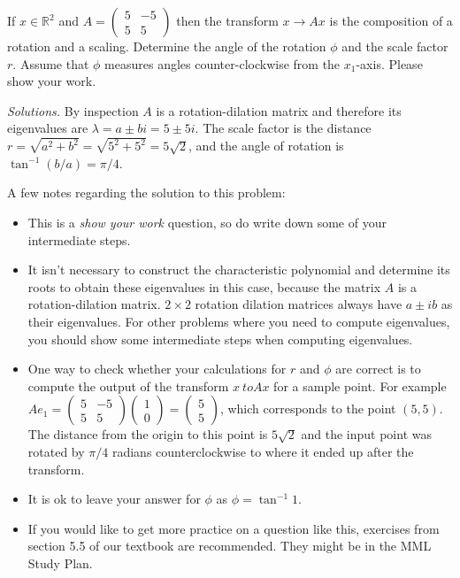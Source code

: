 \ifnum {} \newpage \fi


\ifnum {}
    \question[2] If $x \in \mathbb R^2$ and $A = \begin{pmatrix} 5&-5\\5&5\end{pmatrix}$ then the transform $x \to Ax$ is the composition of a rotation and a scaling. Determine the angle of the rotation $\phi$ and the scale factor $r$. Assume that $\phi$ measures angles counter-clockwise from the $x_1$-axis. Please show your work. 
    
    \ifnum {} {\color{DarkBlue} \textit{Solutions.} 
    By inspection $A$ is a rotation-dilation matrix and therefore its eigenvalues are $\lambda = a \pm bi = 5 \pm 5i$.
    The scale factor is the distance $r = \sqrt{a^2 + b^2} = \sqrt{5^2 + 5^2} = 5\sqrt 2$, and the angle of rotation is $\tan^{-1} (b/a) = \pi/4$. 
    
    A few notes regarding the solution to this problem: 
    \begin{itemize}
        \item This is a \textit{show your work} question, so do write down some of your intermediate steps. 
        \item It isn't necessary to construct the characteristic polynomial and determine its roots to obtain these eigenvalues in this case, because the matrix $A$ is a rotation-dilation matrix. $2\times 2$ rotation dilation matrices always have $a\pm ib$ as their eigenvalues. For other problems where you need to compute eigenvalues, you should show some intermediate steps when computing eigenvalues. 
        \item One way to check whether your calculations for $r$ and $\phi$ are correct is to compute the output of the transform $x \ to Ax$ for a sample point. For example $Ae_1 = \begin{pmatrix} 5&-5\\5&5\end{pmatrix}\begin{pmatrix} 1\\0 \end{pmatrix} = \begin{pmatrix}5\\5 \end{pmatrix}$, which corresponds to the point $(5,5)$. The distance from the origin to this point is $5\sqrt2$ and the input point was rotated by $\pi/4$ radians counterclockwise to where it ended up after the transform. 
        \item It is ok to leave your answer for $\phi$ as $\phi = \tan^{-1} 1$. 
        \item If you would like to get more practice on a question like this, exercises from section 5.5 of our textbook are recommended. They might be in the MML Study Plan. 
    \end{itemize}
     
    
    

    } 
   \else
      
